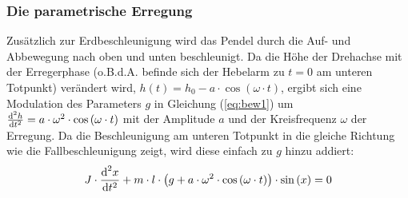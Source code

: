 \documentclass[numbers=noenddot,12pt,a4paper]{scrartcl}
\newcommand{\diff}{\textnormal{d}}
\newcommand{\ix}[1]{_\text{#1}}
\begin{document}
\subsubsection{Die parametrische Erregung}
Zusätzlich zur Erdbeschleunigung wird das Pendel durch die Auf- und Abbewegung nach oben und unten beschleunigt. Da die Höhe der Drehachse mit der Erregerphase (o.B.d.A. befinde sich der Hebelarm zu $t=0$ am unteren Totpunkt) verändert wird, $h(t)=h\ix{0}-a\cdot\cos\left(\omega\cdot t\right)$, ergibt sich eine Modulation des Parameters $g$ in Gleichung (\ref{eq:bew1}) um $\frac{\diff^2 h}{\diff t^2}=a\cdot\omega^2\cdot\cos\left(\omega\cdot t\right)$ mit der Amplitude $a$ und der Kreisfrequenz $\omega$ der Erregung. Da die Beschleunigung am unteren Totpunkt in die gleiche Richtung wie die Fallbeschleunigung zeigt, wird diese einfach zu $g$ hinzu addiert:
\begin{align}
J\cdot\frac{\diff^2 x}{\diff t^2}+m\cdot l\cdot \left(g+a\cdot\omega^2\cdot\cos\left(\omega\cdot t\right)\right)\cdot\sin\left(x\right)=0\label{eq:bew2}
\end{align}
\end{document}
